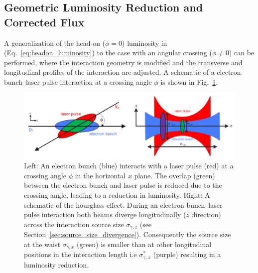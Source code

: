 \documentclass[../main.tex]{subfiles}
\begin{document}
\subsection{Geometric Luminosity Reduction and Corrected Flux}
\label{sec:geometric_luminosity_reduction}

A generalization of the head-on ($\phi = 0$) luminosity in (Eq.~\ref{eq:headon_luminosity}) to the case with an angular crossing ($\phi \neq 0$) can be performed, where the interaction geometry is modified and the transverse and longitudinal profiles of the interaction are adjusted. A schematic of a electron bunch--laser pulse interaction at a crossing angle $\phi$ is shown in Fig.~\ref{fig:angular_crossing_hourglass_effect}.
\begin{figure}[!h]
\centering
\includegraphics[width=\textwidth]{Figures/Photon_Production_by_Inverse_Compton_Scattering/angular_crossing_hourglass_effect.pdf}
\caption{Left: An electron bunch (blue) interacts with a laser pulse (red) at a crossing angle $\phi$ in the horizontal $x$ plane. The overlap (green) between the electron bunch and laser pulse is reduced due to the crossing angle, leading to a reduction in luminosity. Right: A schematic of the hourglass effect. During an electron bunch--laser pulse interaction both beams diverge longitudinally ($z$ direction) across the interaction source size $\sigma_{\gamma,z}$ (see Section~\ref{sec:source_size_divergence}). Consequently the source size at the waist $\sigma_{\gamma,x}$ (green) is smaller than at other longitudinal positions in the interaction length i.e $\sigma_{\gamma,x}^{*}$ (purple) resulting in a luminosity reduction.}
\label{fig:angular_crossing_hourglass_effect}
\end{figure}
\end{document}
